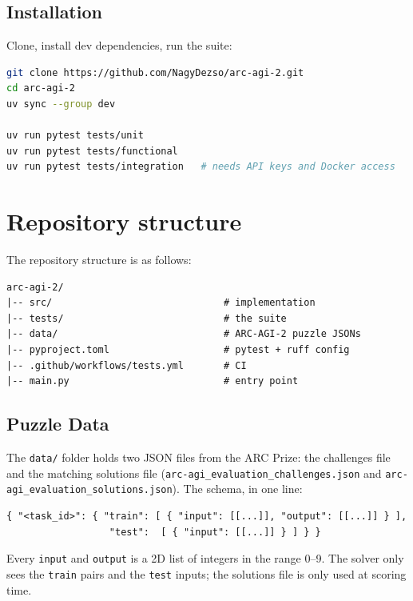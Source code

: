 \documentclass[11pt,a4paper]{article}
\begin{document}
\subsection{Installation}

Clone, install dev dependencies, run the suite:

\begin{lstlisting}[language=bash]
git clone https://github.com/NagyDezso/arc-agi-2.git
cd arc-agi-2
uv sync --group dev

uv run pytest tests/unit
uv run pytest tests/functional
uv run pytest tests/integration   # needs API keys and Docker access
\end{lstlisting}

\section{Repository structure}

The repository structure is as follows:

\begin{lstlisting}[caption={Top-level layout.}]
arc-agi-2/
|-- src/                              # implementation
|-- tests/                            # the suite
|-- data/                             # ARC-AGI-2 puzzle JSONs
|-- pyproject.toml                    # pytest + ruff config
|-- .github/workflows/tests.yml       # CI
|-- main.py                           # entry point
\end{lstlisting}

\subsection{Puzzle Data}

The \texttt{data/} folder holds two JSON files from the ARC Prize: the challenges file and the matching solutions file (\texttt{arc-agi\_evaluation\_challenges.json} and \texttt{arc-agi\_evaluation\_solutions.json}). The schema, in one line:

\begin{lstlisting}[caption={Task schema.}]
{ "<task_id>": { "train": [ { "input": [[...]], "output": [[...]] } ],
                  "test":  [ { "input": [[...]] } ] } }
\end{lstlisting}

Every \texttt{input} and \texttt{output} is a 2D list of integers in the range 0--9. The solver only sees the \texttt{train} pairs and the \texttt{test} inputs; the solutions file is only used at scoring time.
\end{document}
